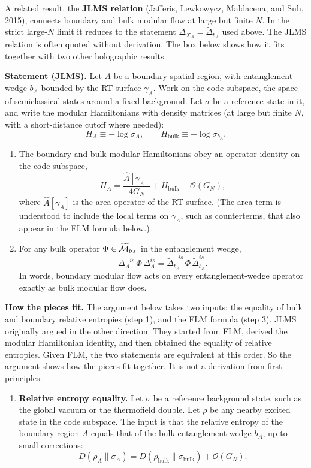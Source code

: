 A related result, the \textbf{JLMS relation} (Jafferis, Lewkowycz, Maldacena, and Suh, 2015), connects
boundary and bulk modular flow at large but finite $N$. In the strict large-$N$ limit it reduces to the
statement $\Delta_{X_A}=\widetilde\Delta_{b_A}$ used above. The JLMS relation is often quoted without
derivation. The box below shows how it fits together with two other holographic results.

\begin{keyresult}
\textbf{Statement (JLMS).} Let $A$ be a boundary spatial region, with entanglement wedge $b_A$ bounded by the
RT surface $\gamma_A$. Work on the code subspace, the space of semiclassical states around a fixed
background. Let $\sigma$ be a reference state in it, and write the modular Hamiltonians with density matrices
(at large but finite $N$, with a short-distance cutoff where needed):
\[
H_A \equiv -\log\sigma_A , \qquad H_{\text{bulk}} \equiv -\log\sigma_{b_A} .
\]
\begin{enumerate}
\item The boundary and bulk modular Hamiltonians obey an operator identity on the code subspace,
\[
H_A = \frac{\hat A[\gamma_A]}{4G_N} + H_{\text{bulk}} + \mathcal{O}(G_N) ,
\]
where $\hat A[\gamma_A]$ is the area operator of the RT surface. (The area term is understood to include the
local terms on $\gamma_A$, such as counterterms, that also appear in the FLM formula below.)
\item For any bulk operator $\Phi \in \widetilde{\mathcal{M}}_{b_A}$ in the entanglement wedge,
\[
\Delta_A^{-is}\,\Phi\,\Delta_A^{is} = \widetilde\Delta_{b_A}^{-is}\,\Phi\,\widetilde\Delta_{b_A}^{is} .
\]
In words, boundary modular flow acts on every entanglement-wedge operator exactly as bulk modular flow does.
\end{enumerate}

\textbf{How the pieces fit.} The argument below takes two inputs: the equality of bulk and boundary relative
entropies (step 1), and the FLM formula (step 3). JLMS originally argued in the other direction. They started
from FLM, derived the modular Hamiltonian identity, and then obtained the equality of relative entropies.
Given FLM, the two statements are equivalent at this order. So the argument shows how the pieces fit
together. It is not a derivation from first principles.
\begin{enumerate}[leftmargin=*]
\item \textbf{Relative entropy equality.}
Let $\sigma$ be a reference background state, such as the global vacuum or the thermofield double. Let $\rho$
be any nearby excited state in the code subspace. The input is that the relative entropy of the boundary
region $A$ equals that of the bulk entanglement wedge $b_A$, up to small corrections:
\[
D(\rho_A \| \sigma_A) = D(\rho_{\text{bulk}} \| \sigma_{\text{bulk}}) + \mathcal{O}(G_N) .
\]


\end{enumerate}
\end{keyresult}
